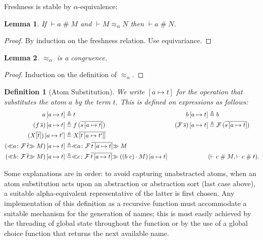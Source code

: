 \documentclass[copyright,creativecommons]{eptcs}
\newtheorem{definition}{Definition}
\newtheorem{lemma}{Lemma}
\newcounter{s}
\newcommand{\absterm}[2]{\ensuremath{\ll\!\!#1\!\!\gg #2}}
\newcommand{\concr}[2]{#1[#2]}
\newcommand{\vect}[1]{\ensuremath{\overline{#1}}}
\newcommand{\sconstr}[2]{\ensuremath{#1\,#2}}
\newcommand{\ofType}{\colon}
\newcommand {\act}      [0] {\cdot}
\newcommand {\prmAct}   [2] {#1 \act #2}
\newcommand {\aSubAct} [2] {#1 \, #2}
\newcommand{\varTrmD} [3] {\ensuremath{#3}} %
\newcommand {\absTrmD}  [3] {\absterm{#1 \ofType #2} #3}
\newcommand {\appTrm}  [2] {\sconstr{#1}{#2}}
\newcommand {\susp}    [2] {\ifthenelse{\isempty{#1}}
                                       {\ifthenelse{\isempty{#2}}{}{#2}}
                                       {\ifthenelse{\isempty{#2}}{#1}{#1  | #2}}}
\newcommand {\cent}     [0] {\vdash}
\newcommand {\hsh}      [0] {\#}
\newcommand {\frsh}    [0] {\mathrel{\hsh}}
\newcommand {\trans}    [2] {(#1 \ #2)}
\newcommand {\al}       [0] {{\approx_\alpha}}
\newcommand {\aleq}     [0] {\mathrel{\al}}
\newcommand {\joinTsubs} [2] {#1 \circ #2}
\begin{document}
\noindent Freshness is stable by $\alpha$-equivalence:
\begin{lemma}
If $\cent a \frsh M$ and $\cent M \aleq N$ then $\cent a \frsh N$.
\end{lemma}

\begin{proof}
By induction on the freshness relation. Use equivariance.
\end{proof}
\begin{lemma}
$\aleq$ is a congruence.
\end{lemma}
\begin{proof}
    Induction on the definition of $\aleq$.
\end{proof}

\newcommand{\asubs}[2]{\ensuremath{[#1 \mapsto #2]}}

\begin{definition}[Atom Substitution]
\label{dependent:atom_substitution}
We write \asubs{a}{t} for the operation that substitutes the atom $a$ by the term $t$. This is defined on expressions as follows:
\begin{alignat*}{2}
\aSubAct{a}{\asubs{a}{t}} & \triangleq  t & \qquad
\aSubAct{b}{\asubs{a}{t}} & \triangleq  b \\
\aSubAct{(\appTrm{f}{\vect{s}})}{\asubs{a}{t}} & \triangleq  \appTrm{f}{(\vect{\aSubAct{s}{\asubs{a}{t}}})} &
\aSubAct{(\appTrm{\mathcal{F}}{\vect{s}})}{\asubs{a}{t}} & \triangleq  \appTrm{\mathcal{F}}{(\vect{\aSubAct{s}{\asubs{a}{t}}})} \\
\aSubAct{(\varTrmD{\asubs{a}{t}}{\pi}{X} \vect{\concr{}{t}})}{\asubs{a}{t'}} & \triangleq \varTrmD{(\joinTsubs{\vartheta'}{\vartheta})}{\pi}{X} \vect{\concr{}{\aSubAct{t}{\asubs{a}{t'}}}} &  & \\
\aSubAct{(\absTrmD{a}{\sconstr{\mathcal{F}}{\vect{t}}}{M})}{\asubs{a}{t}} & \triangleq \absTrmD{a}{\sconstr{\mathcal{F}}{\vect{\aSubAct{t}{\asubs{a}{t}}}}}{M}  &   \\
\aSubAct{(\absTrmD{b}{\sconstr{\mathcal{F}}{\vect{t}}}{M})}{\asubs{a}{t}} & \triangleq \absTrmD{c}{\sconstr{\mathcal{F}}{\vect{\aSubAct{t}{\asubs{a}{t}}}}}{\aSubAct{(\prmAct{\trans{b}{c}}{M})}{\asubs{a}{t}}}  &  & (\cent c \frsh M, \cent c \frsh t)  . 
\end{alignat*}
\end{definition}

Some explanations are in order: 
to avoid capturing unabstracted atoms,  when an atom substitution acts upon an abstraction or abstraction sort (last case above),
a suitable alpha-equivalent representative of the latter is first chosen.
Any implementation of this definition as a recursive function must accommodate a suitable mechanism for the generation of names; this is most easily achieved by the threading of global state throughout the function or by the use of a global choice function that returns the next available name.\\
\end{document}
